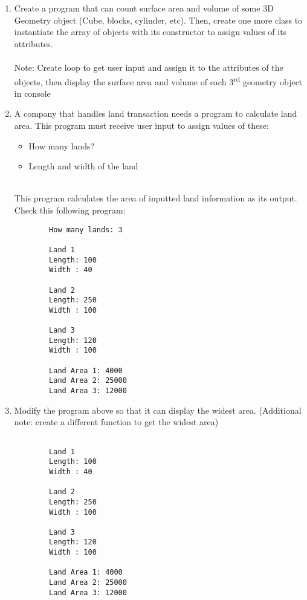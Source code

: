 \documentclass[12pt,titlepage]{article}
\begin{document}
\begin{enumerate}
    \item Create a program that can count surface area and volume of some 3D Geometry object (Cube, blocks, cylinder, etc). Then, create one more class to instantiate the array of objects with its constructor to assign values of its attributes.
    \mbox{}\\
    \mbox{}\\Note: Create loop to get user input and assign it to the attributes of the objects, then display
    the surface area and volume of each 3\textsuperscript{rd} geometry object in console
    \item A company that handles land transaction needs a program to calculate land area. This program must receive user input to assign values of these:
    \begin{itemize}
        \item How many lands?
        \item Length and width of the land
    \end{itemize}
    \mbox{}\\ This program calculates the area of inputted land information as its output. Check this following program:
    \begin{verbatim}
        How many lands: 3

        Land 1
        Length: 100
        Width : 40

        Land 2
        Length: 250
        Width : 100

        Land 3
        Length: 120
        Width : 100

        Land Area 1: 4000
        Land Area 2: 25000
        Land Area 3: 12000
    \end{verbatim}
    \item Modify the program above so that it can display the widest area. (Additional note: create a different function to get the widest area)
    \mbox{}\\
    \begin{verbatim}
        
        Land 1
        Length: 100
        Width : 40

        Land 2
        Length: 250
        Width : 100

        Land 3
        Length: 120
        Width : 100

        Land Area 1: 4000
        Land Area 2: 25000
        Land Area 3: 12000
        

\end{verbatim}
\end{enumerate}
\end{document}
